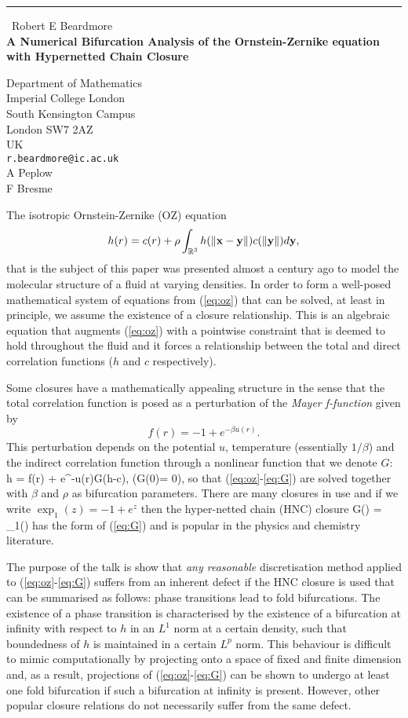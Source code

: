 \documentclass{report}
\begin{document}
\begin{center}
\rule{6in}{1pt} \
{\large Robert E Beardmore \\
{\bf A Numerical Bifurcation Analysis of the Ornstein-Zernike equation with Hypernetted Chain Closure}}

Department of Mathematics \\ Imperial College London \\ South Kensington Campus \\ London SW7 2AZ \\ UK
\\
{\tt r.beardmore@ic.ac.uk}\\
A Peplow\\
F Bresme\end{center}

The isotropic Ornstein-Zernike (OZ) equation
\begin{equation}
\label{eq:oz} h(r) = c(r) + \rho \int_{\mathbb{R}^{3}} h(\|{\bf x}-{\bf
y}\|)c(\|{\bf y}\|)d{\bf y},
\end{equation}
that is the subject of this paper was presented almost a century ago to
model the molecular
structure of a fluid at varying densities.
In order to form a well-posed mathematical system of equations from
(\ref{eq:oz}) that can be solved, at least in principle, we assume the
existence of a closure relationship. This is an algebraic equation that
augments (\ref{eq:oz}) with a pointwise constraint that is deemed to hold
throughout the fluid and it forces a relationship between the total and
direct correlation functions ($h$ and $c$ respectively).

Some closures have a mathematically appealing structure in the sense that
the total correlation function is posed as a perturbation of the {\em
Mayer f-function} given by
\[ f(r)=-1+e^{-\beta u(r)}.\]
This perturbation depends on the potential $u$, temperature (essentially
$1/\beta$) and the
indirect correlation function through a nonlinear function that we denote
$G$: \be h = f(r) + e^{-\beta u(r)}G(h-c),\qquad
(G(0)= 0), \label{eq:G} \ee so that (\ref{eq:oz}-\ref{eq:G}) are solved
together with $\beta$ and $\rho$ as bifurcation parameters. There are
many closures in use and if we
write $\exp_1(z) = -1+e^z$ then the hyper-netted chain (HNC) closure \be
G(\gamma) = \exp_1(\gamma) \ee has the form of
(\ref{eq:G}) and is popular in the physics and chemistry literature.

The purpose of the talk is show that {\em any reasonable} discretisation
method applied to (\ref{eq:oz}-\ref{eq:G}) suffers from an inherent
defect if the HNC closure is used that can be summarised as follows:
phase transitions lead to fold bifurcations. The existence of a phase
transition is characterised by the existence of a bifurcation at infinity
with respect to $h$ in an $L^1$ norm at a certain density, such that
boundedness of $h$ is maintained in a certain $L^p$ norm. This behaviour
is difficult to mimic computationally by projecting onto a space of fixed
and finite dimension and, as a result, projections of
(\ref{eq:oz}-\ref{eq:G}) can be shown to undergo at least one fold
bifurcation if such a bifurcation at infinity is present. However, other
popular closure relations do not necessarily suffer from the same defect.
\end{document}
